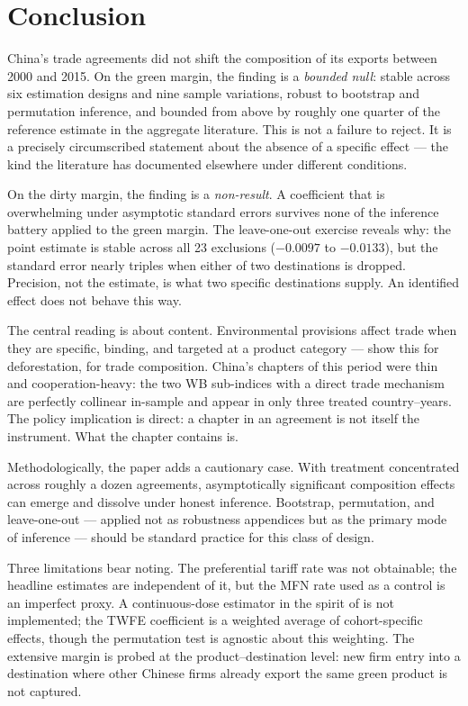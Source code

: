 \documentclass[12pt]{article}
\begin{document}
\section{Conclusion}\label{sec:conclusion}

China's trade agreements did not shift the composition of its exports between 2000 and 2015.
On the green margin, the finding is a \emph{bounded null}: stable across six estimation
designs and nine sample variations, robust to bootstrap and permutation inference, and
bounded from above by roughly one quarter of the reference estimate in the aggregate
literature. This is not a failure to reject. It is a precisely circumscribed statement
about the absence of a specific effect --- the kind the literature has documented elsewhere
under different conditions.

On the dirty margin, the finding is a \emph{non-result}. A coefficient that is overwhelming
under asymptotic standard errors survives none of the inference battery applied to the green
margin. The leave-one-out exercise reveals why: the point estimate is stable across all 23
exclusions ($-0.0097$ to $-0.0133$), but the standard error nearly triples when either of
two destinations is dropped. Precision, not the estimate, is what two specific destinations
supply. An identified effect does not behave this way.

The central reading is about content. Environmental provisions affect trade when they are
specific, binding, and targeted at a product category --- \citet{abman2024} show this for
deforestation, \citet{brandi2020} for trade composition. China's chapters of this period
were thin and cooperation-heavy: the two WB sub-indices with a direct trade mechanism are
perfectly collinear in-sample and appear in only three treated country--years. The policy
implication is direct: a chapter in an agreement is not itself the instrument. What the
chapter contains is.

Methodologically, the paper adds a cautionary case. With treatment concentrated across
roughly a dozen agreements, asymptotically significant composition effects can emerge and
dissolve under honest inference. Bootstrap, permutation, and leave-one-out --- applied not
as robustness appendices but as the primary mode of inference --- should be standard
practice for this class of design.

Three limitations bear noting. The preferential tariff rate was not obtainable; the headline
estimates are independent of it, but the MFN rate used as a control is an imperfect proxy.
A continuous-dose estimator in the spirit of \citet{callaway2024} is not implemented; the
TWFE coefficient is a weighted average of cohort-specific effects, though the permutation
test is agnostic about this weighting. The extensive margin is probed at the
product--destination level: new firm entry into a destination where other Chinese firms
already export the same green product is not captured.
\end{document}
